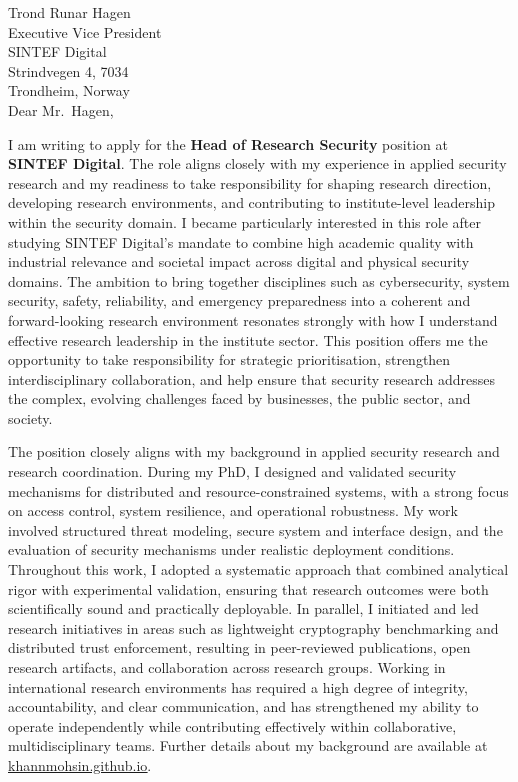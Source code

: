 Trond Runar Hagen\\
Executive Vice President\\
SINTEF Digital\\
Strindvegen 4, 7034\\
Trondheim, Norway\\

Dear Mr.\ Hagen,

I am writing to apply for the \textbf{Head of Research Security} position at \textbf{SINTEF Digital}. The role aligns closely with my experience in applied security research and my readiness to take responsibility for shaping research direction, developing research environments, and contributing to institute-level leadership within the security domain.
%
I became particularly interested in this role after studying SINTEF Digital’s mandate to combine high academic quality with industrial relevance and societal impact across digital and physical security domains. The ambition to bring together disciplines such as cybersecurity, system security, safety, reliability, and emergency preparedness into a coherent and forward-looking research environment resonates strongly with how I understand effective research leadership in the institute sector. This position offers me the opportunity to take responsibility for strategic prioritisation, strengthen interdisciplinary collaboration, and help ensure that security research addresses the complex, evolving challenges faced by businesses, the public sector, and society.

The position closely aligns with my background in applied security research and research coordination. During my PhD, I designed and validated security mechanisms for distributed and resource-constrained systems, with a strong focus on access control, system resilience, and operational robustness. My work involved structured threat modeling, secure system and interface design, and the evaluation of security mechanisms under realistic deployment conditions. Throughout this work, I adopted a systematic approach that combined analytical rigor with experimental validation, ensuring that research outcomes were both scientifically sound and practically deployable. In parallel, I initiated and led research initiatives in areas such as lightweight cryptography benchmarking and distributed trust enforcement, resulting in peer-reviewed publications, open research artifacts, and collaboration across research groups. Working in international research environments has required a high degree of integrity, accountability, and clear communication, and has strengthened my ability to operate independently while contributing effectively within collaborative, multidisciplinary teams. Further details about my background are available at \href{https://khannmohsin.github.io}{\underline{khannmohsin.github.io}}.


